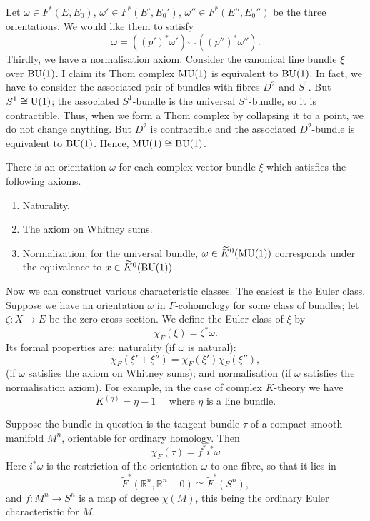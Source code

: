 \documentclass[../main]{subfiles}
\begin{document}
Let $\omega\in F^\ast (E,E_0)$, $\omega'\in F^\ast (E',E_0')$, $\omega''\in F^\ast (E'',E_0'')$ be the three orientations. We would like them to satisfy
\[\omega = ((p')^\ast \omega')\smile ((p'')^\ast \omega'').\]
Thirdly, we have a normalisation axiom. Consider the canonical line bundle $\xi$ over $\mathrm{BU}(1)$. I claim its Thom complex $\mathrm{MU}(1)$ is equivalent to $\mathrm{BU}(1)$. In fact, we have to consider the associated pair of bundles with fibres $D^2$ and $S^1$. But $S^1\cong \mathrm{U}(1)$; the associated $S^1$-bundle is the universal $S^1$-bundle, so it is contractible. Thus, when we form a Thom complex by collapsing it to a point, we do not change anything. But $D^2$ is contractible and the associated $D^2$-bundle is equivalent to $\mathrm{BU}(1)$. Hence, $\mathrm{MU}(1)\cong \mathrm{BU}(1)$.
\begin{proposition}\label{prop:p3ch11.3}
There is an orientation $\omega$ for each complex vector-bundle $\xi$ which satisfies the following axioms.
\begin{enumerate}
    \item Naturality.
    \item The axiom on Whitney sums.
    \item Normalization; for the universal bundle, $\omega \in \widetilde{K}^0(\mathrm{MU}(1))$ corresponds under the equivalence to $x\in \widetilde{K}^0(\mathrm{BU}(1))$. 
\end{enumerate}
\end{proposition}
\par Now we can construct various characteristic classes. The easiest is the Euler class. Suppose we have an orientation $\omega$ in $F$-cohomology for some class of bundles; let $\zeta:X\longrightarrow E$ be the zero cross-section. We define the Euler class of $\xi$ by
\[\chi_F(\xi)=\zeta^\ast \omega.\]
Its formal properties are: naturality (if $\omega$ is natural):
\[\chi_F(\xi'+\xi'')=\chi_F(\xi')\chi_F(\xi''),\]
(if $\omega$ satisfies the axiom on Whitney sums); and normalisation (if $\omega$ satisfies the normalisation axiom). For example, in the case of complex $K$-theory we have \[K^{(\eta)}=\eta-1 \quad \text{ where } \eta \text{ is a line bundle.} \]
\begin{proposition}\label{prop:p3ch11.4}
Suppose the bundle in question is the tangent bundle $\tau$ of a compact smooth manifold $M^n$, orientable for ordinary homology. Then
\[\chi_F(\tau)=f^\ast i^\ast \omega\]
Here $i^\ast \omega$ is the restriction of the orientation $\omega$ to one fibre, so that it lies in 
\[\tilde{F}^\ast (\mathbb{R}^n, \mathbb{R}^n-0)\cong \tilde{F}^\ast (S^n),\]
and $f:M^n\longrightarrow S^n$ is a map of degree $\chi(M)$, this being the ordinary Euler characteristic for $M$.
\end{proposition}
\end{document}

